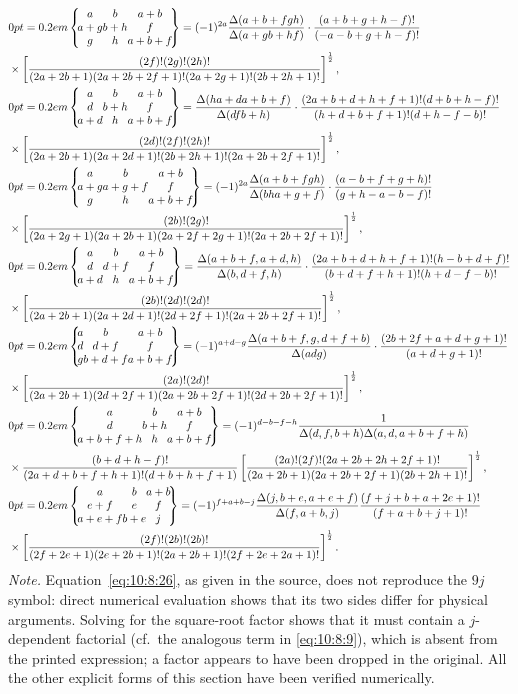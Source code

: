 \begin{align}
& \ninej{a}{b}{a+b}{a+g}{b+h}{f}{g}{h}{a+b+f}=(-1)^{2 a} \frac{\Delta(a+b+f g h)}{\Delta(a+g b+h f)} \cdot \frac{(a+b+g+h-f)!}{(-a-b+g+h-f)!}  \notag\\
& \times\left[\frac{(2 f)!(2 g)!(2 h)!}{(2 a+2 b+1)(2 a+2 b+2 f+1)!(2 a+2 g+1)!(2 b+2 h+1)!}\right]^{\frac{1}{2}},  \label{eq:10:8:20}\\
& \ninej{a}{b}{a+b}{d}{b+h}{f}{a+d}{h}{a+b+f}=\frac{\Delta(h a+d a+b+f)}{\Delta(d f b+h)} \cdot \frac{(2 a+b+d+h+f+1)!(d+b+h-f)!}{(h+d+b+f+1)!(d+h-f-b)!}  \notag\\
& \times\left[\frac{(2 d)!(2 f)!(2 h)!}{(2 a+2 b+1)(2 a+2 d+1)!(2 b+2 h+1)!(2 a+2 b+2 f+1)!}\right]^{\frac{1}{2}},  \label{eq:10:8:21}\\
& \ninej{a}{b}{a+b}{a+g}{a+g+f}{f}{g}{h}{a+b+f}=(-1)^{2 a} \frac{\Delta(a+b+f g h)}{\Delta(b h a+g+f)} \cdot \frac{(a-b+f+g+h)!}{(g+h-a-b-f)!}  \notag\\
& \times\left[\frac{(2 b)!(2 g)!}{(2 a+2 g+1)(2 a+2 b+1)(2 a+2 f+2 g+1)!(2 a+2 b+2 f+1)!}\right]^{\frac{1}{2}},  \label{eq:10:8:22}\\
& \ninej{a}{b}{a+b}{d}{d+f}{f}{a+d}{h}{a+b+f}=\frac{\Delta(a+b+f, a+d, h)}{\Delta(b, d+f, h)} \cdot \frac{(2 a+b+d+h+f+1)!(h-b+d+f)!}{(b+d+f+h+1)!(h+d-f-b)!}  \notag\\
& \times\left[\frac{(2 b)!(2 d)!(2 d)!}{(2 a+2 b+1)(2 a+2 d+1)!(2 d+2 f+1)!(2 a+2 b+2 f+1)!}\right]^{\frac{1}{2}},  \label{eq:10:8:23}\\
& \ninej{a}{b}{a+b}{d}{d+f}{f}{g}{b+d+f}{a+b+f}=(-1)^{a+d-g} \frac{\Delta(a+b+f, g, d+f+b)}{\Delta(a d g)} \cdot \frac{(2 b+2 f+a+d+g+1)!}{(a+d+g+1)!}  \notag\\
& \times\left[\frac{(2 a)!(2 d)!}{(2 a+2 b+1)(2 d+2 f+1)(2 a+2 b+2 f+1)!(2 d+2 b+2 f+1)!}\right]^{\frac{1}{2}},  \label{eq:10:8:24}\\
& \ninej{a}{b}{a+b}{d}{b+h}{f}{a+b+f+h}{h}{a+b+f}=(-1)^{d-b-f-h} \frac{1}{\Delta(d, f, b+h) \Delta(a, d, a+b+f+h)}  \notag\\
& \times \frac{(b+d+h-f)!}{(2 a+d+b+f+h+1)!(d+b+h+f+1)}\left[\frac{(2 a)!(2 f)!(2 a+2 b+2 h+2 f+1)!}{(2 a+2 b+1)(2 a+2 b+2 f+1)(2 b+2 h+1)!}\right]^{\frac{1}{2}},  \label{eq:10:8:25}\\
& \ninej{a}{b}{a+b}{e+f}{e}{f}{a+e+f}{b+e}{j}=(-1)^{f+a+b-j} \frac{\Delta(j, b+e, a+e+f)}{\Delta(f, a+b, j)} \frac{(f+j+b+a+2 e+1)!}{(f+a+b+j+1)!}  \notag\\
& \times\left[\frac{(2 f)!(2 b)!(2 b)!}{(2 f+2 e+1)(2 e+2 b+1)!(2 a+2 b+1)!(2 f+2 e+2 a+1)!}\right]^{\frac{1}{2}} . \label{eq:10:8:26}
\end{align}
\emph{Note.} Equation~\eqref{eq:10:8:26}, as given in the source, does not reproduce the $9j$ symbol: direct numerical evaluation shows that its two sides differ for physical arguments. Solving for the square-root factor shows that it must contain a $j$-dependent factorial (cf.\ the analogous term in \eqref{eq:10:8:9}), which is absent from the printed expression; a factor appears to have been dropped in the original. All the other explicit forms of this section have been verified numerically.
